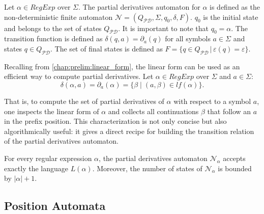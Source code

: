 \begin{defn}
	Let $\alpha \in RegExp$ over $\Sigma$. The partial derivatives automaton for $\alpha$ is defined as the non-deterministic finite automaton $\mathcal{N} = (Q_{\mathcal{PD}}, \Sigma, q_0, \delta, F)$. $q_0$ is the initial state and belongs to the set of states $Q_{\mathcal{PD}}$. It is important to note that $q_0 = \alpha$. The transition function is defined as $\delta(q,a) = \partial_a(q)$ for all symbols $a \in \Sigma$ and states $q \in Q_{\mathcal{PD}}$. The set of final states is defined as $F = \{ q \in Q_{\mathcal{PD}} \, | \, \varepsilon(q) = \varepsilon \}$.
\end{defn}

Recalling from \ref{chap:prelim:linear_form}, the linear form can be used as an efficient way to compute partial derivatives.
Let $\alpha \in RegExp$ over $\Sigma$ and $a \in \Sigma$:
\[
\delta(\alpha, a) = \partial_a(\alpha) = \{ \beta \mid (a,\beta) \in lf(\alpha) \}.
\]

That is, to compute the set of partial derivatives of $\alpha$ with respect to a symbol $a$, one inspects the linear form of $\alpha$ and collects all continuations $\beta$ that follow an $a$ in the prefix position. This characterization is not only concise but also algorithmically useful: it gives a direct recipe for building the transition relation of the partial derivatives automaton.

\begin{thm}
	For every regular expression $\alpha$, the partial derivatives automaton $\mathcal{N}_\alpha$ accepts exactly the language $L(\alpha)$. Moreover, the number of states of $\mathcal{N}_\alpha$ is bounded by $|\alpha|+1$.
\end{thm}



\subsection{Position Automata}
\label{chap:prelim:pos_auto}


